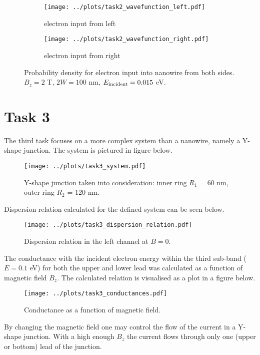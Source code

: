 \documentclass[12pt,a4]{article}
\begin{document}
\begin{figure}[H]
	\begin{subfigure}{.5\textwidth}
		\texttt{[image: ../plots/task2\_wavefunction\_left.pdf]}
		\caption{electron input from left}
	\end{subfigure}
	\begin{subfigure}{.5\textwidth}
		\texttt{[image: ../plots/task2\_wavefunction\_right.pdf]}
		\caption{electron input from right}
	\end{subfigure}
	\caption{Probability density for electron input into nanowire from both sides. $ B_z = 2 $ T, $ 2W = 100 $ nm, $ E_{\text{incident}} = 0.015 $ eV.}
\end{figure}

\section*{Task 3}

The third task focuses on a more complex system than a nanowire, namely a Y-shape junction. The system is pictured in figure below.

\begin{figure}[H]
	\texttt{[image: ../plots/task3\_system.pdf]}
	\caption{Y-shape junction taken into consideration: inner ring $ R_1 $ = 60 nm, outer ring $ R_2 $ = 120 nm.}
\end{figure}

Dispersion relation calculated for the defined system can be seen below.

\begin{figure}[H]
	\texttt{[image: ../plots/task3\_dispersion\_relation.pdf]}
	\caption{Dispersion relation in the left channel at $ B=0 $.}
\end{figure}

The conductance with the incident electron energy within the third sub-band ($ E=0.1 $ eV) for both the upper and lower lead was calculated as a function of magnetic field $ B_z $. The calculated relation is visualised as a plot in a figure below.

\begin{figure}[H]
	\texttt{[image: ../plots/task3\_conductances.pdf]}
	\caption{Conductance as a function of magnetic field.}
\end{figure}

By changing the magnetic field one may control the flow of the current in a Y-shape junction. With a high enough $ B_z $ the current flows through only one (upper or bottom) lead of the junction.
\end{document}
